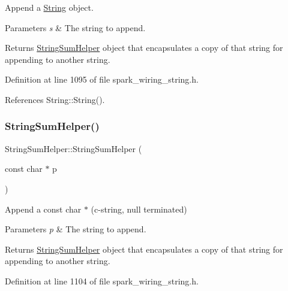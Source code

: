 Append a \hyperlink{class_string}{String} object. 


\begin{DoxyParams}{Parameters}
{\em s} & The string to append.\\
\hline
\end{DoxyParams}
\begin{DoxyReturn}{Returns}
\hyperlink{class_string_sum_helper}{String\+Sum\+Helper} object that encapsulates a copy of that string for appending to another string. 
\end{DoxyReturn}


Definition at line 1095 of file spark\+\_\+wiring\+\_\+string.\+h.



References String\+::\+String().

\mbox{\label{class_string_sum_helper_a73893e195336a0bcea77b16f4b35b422}} 
\subsubsection{\texorpdfstring{String\+Sum\+Helper()}{StringSumHelper()}\hspace{0.1cm}{\footnotesize\ttfamily [2/8]}}
{\footnotesize\ttfamily String\+Sum\+Helper\+::\+String\+Sum\+Helper (\begin{DoxyParamCaption}\item[{const char $\ast$}]{p }\end{DoxyParamCaption})\hspace{0.3cm}{\ttfamily [inline]}}



Append a const char $\ast$ (c-\/string, null terminated) 


\begin{DoxyParams}{Parameters}
{\em p} & The string to append.\\
\hline
\end{DoxyParams}
\begin{DoxyReturn}{Returns}
\hyperlink{class_string_sum_helper}{String\+Sum\+Helper} object that encapsulates a copy of that string for appending to another string. 
\end{DoxyReturn}


Definition at line 1104 of file spark\+\_\+wiring\+\_\+string.\+h.



